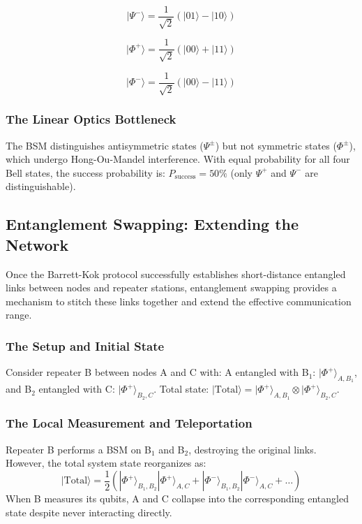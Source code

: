 \begin{equation}
|\Psi^-\rangle = \frac{1}{\sqrt{2}}(|01\rangle - |10\rangle)
\end{equation}

\begin{equation}
|\Phi^+\rangle = \frac{1}{\sqrt{2}}(|00\rangle + |11\rangle)
\end{equation}

\begin{equation}
|\Phi^-\rangle = \frac{1}{\sqrt{2}}(|00\rangle - |11\rangle)
\end{equation}

\subsubsection{The Linear Optics Bottleneck}

The BSM distinguishes antisymmetric states ($\Psi^\pm$) but not symmetric states ($\Phi^\pm$), which undergo Hong-Ou-Mandel interference. With equal probability for all four Bell states, the success probability is: $P_{\text{success}} = 50\%$ (only $\Psi^+$ and $\Psi^-$ are distinguishable).

\subsection{Entanglement Swapping: Extending the Network}

Once the Barrett-Kok protocol successfully establishes short-distance entangled links between nodes and repeater stations, entanglement swapping provides a mechanism to stitch these links together and extend the effective communication range.

\subsubsection{The Setup and Initial State}

Consider repeater B between nodes A and C with: A entangled with B$_1$: $|\Phi^+\rangle_{A,B_1}$, and B$_2$ entangled with C: $|\Phi^+\rangle_{B_2,C}$. Total state: $|\text{Total}\rangle = |\Phi^+\rangle_{A,B_1} \otimes |\Phi^+\rangle_{B_2,C}$.

\subsubsection{The Local Measurement and Teleportation}

Repeater B performs a BSM on B$_1$ and B$_2$, destroying the original links. However, the total system state reorganizes as:
$$|\text{Total}\rangle = \frac{1}{2}(|\Phi^+\rangle_{B_1,B_2} |\Phi^+\rangle_{A,C} + |\Phi^-\rangle_{B_1,B_2} |\Phi^-\rangle_{A,C} + \ldots)$$
When B measures its qubits, A and C collapse into the corresponding entangled state despite never interacting directly.

